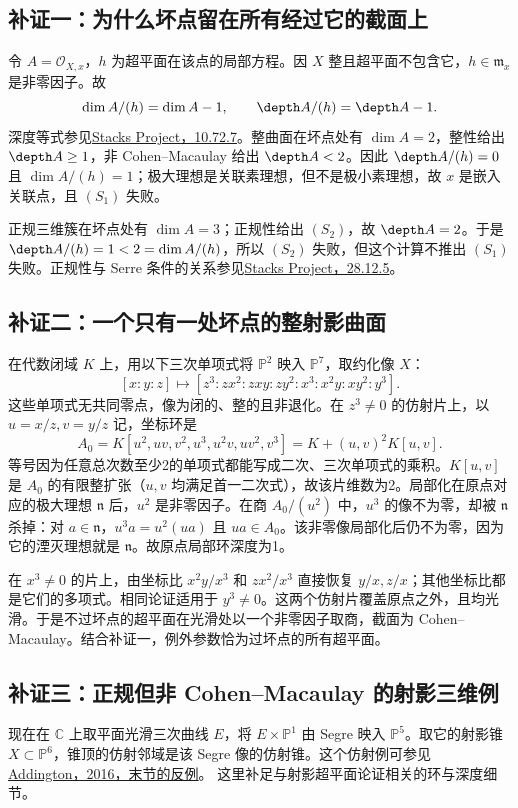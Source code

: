 \documentclass[UTF8,a4paper]{ctexbook}
\begin{document}
\subsection*{补证一：为什么坏点留在所有经过它的截面上}
令 $A=\mathcal O_{X,x}$，$h$ 为超平面在该点的局部方程。因 $X$ 整且超平面不包含它，$h\in\mathfrak m_x$ 是非零因子。故
\[
 \dim A/(h)=\dim A-1,\qquad
 \depth A/(h)=\depth A-1.
\]
深度等式参见\href{https://stacks.math.columbia.edu/tag/00LE}{Stacks Project，10.72.7}。整曲面在坏点处有 $\dim A=2$，整性给出 $\depth A\ge1$，非 Cohen--Macaulay 给出 $\depth A<2$。因此 $\depth A/(h)=0$ 且 $\dim A/(h)=1$；极大理想是关联素理想，但不是极小素理想，故 $x$ 是嵌入关联点，且 $(S_1)$ 失败。

正规三维簇在坏点处有 $\dim A=3$；正规性给出 $(S_2)$，故 $\depth A=2$。于是 $\depth A/(h)=1<2=\dim A/(h)$，所以 $(S_2)$ 失败，但这个计算不推出 $(S_1)$ 失败。正规性与 Serre 条件的关系参见\href{https://stacks.math.columbia.edu/tag/033P}{Stacks Project，28.12.5}。

\subsection*{补证二：一个只有一处坏点的整射影曲面}
在代数闭域 $K$ 上，用以下三次单项式将 $\mathbb P^2$ 映入 $\mathbb P^7$，取约化像 $X$：
\[
 [x:y:z]\longmapsto
 [z^3:zx^2:zxy:zy^2:x^3:x^2y:xy^2:y^3].
\]
这些单项式无共同零点，像为闭的、整的且非退化。在 $z^3\ne0$ 的仿射片上，以 $u=x/z,v=y/z$ 记，坐标环是
\[
 A_0=K[u^2,uv,v^2,u^3,u^2v,uv^2,v^3]
       =K+(u,v)^2K[u,v].
\]
等号因为任意总次数至少2的单项式都能写成二次、三次单项式的乘积。$K[u,v]$ 是 $A_0$ 的有限整扩张（$u,v$ 均满足首一二次式），故该片维数为2。局部化在原点对应的极大理想 $\mathfrak n$ 后，$u^2$ 是非零因子。在商 $A_0/(u^2)$ 中，$u^3$ 的像不为零，却被 $\mathfrak n$ 杀掉：对 $a\in\mathfrak n$，$u^3a=u^2(ua)$ 且 $ua\in A_0$。该非零像局部化后仍不为零，因为它的湮灭理想就是 $\mathfrak n$。故原点局部环深度为1。

在 $x^3\ne0$ 的片上，由坐标比 $x^2y/x^3$ 和 $zx^2/x^3$ 直接恢复 $y/x,z/x$；其他坐标比都是它们的多项式。相同论证适用于 $y^3\ne0$。这两个仿射片覆盖原点之外，且均光滑。于是不过坏点的超平面在光滑处以一个非零因子取商，截面为 Cohen--Macaulay。结合补证一，例外参数恰为过坏点的所有超平面。


\subsection*{补证三：正规但非 Cohen--Macaulay 的射影三维例}
现在在 $\mathbb C$ 上取平面光滑三次曲线 $E$，将 $E\times\mathbb P^1$ 由 Segre 映入 $\mathbb P^5$。取它的射影锥 $X\subset\mathbb P^6$，锥顶的仿射邻域是该 Segre 像的仿射锥。这个仿射例可参见
\href{https://content.algebraicgeometry.nl/2016-2/2016-2-011.pdf}{Addington，2016，末节的反例}。
这里补足与射影超平面论证相关的环与深度细节。
\end{document}
